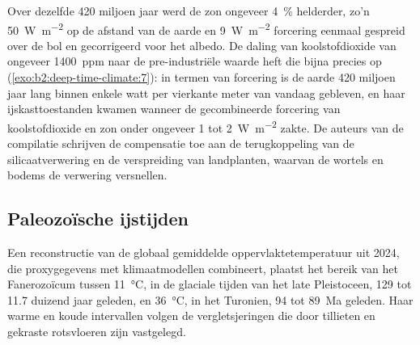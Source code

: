 \begin{omfigure}
\par{}
\end{omfigure}

Over dezelfde 420 miljoen jaar werd de zon ongeveer \qty{4}{\percent} helderder, zo'n
\qty{50}{W.m^{-2}} op de afstand van de aarde en \qty{9}{W.m^{-2}} forcering eenmaal gespreid over de
bol en gecorrigeerd voor het albedo. De daling van koolstofdioxide van ongeveer \qty{1400}{ppm} naar de
pre-industriële waarde heft die bijna precies op (\cref{exo:b2:deep-time-climate:7}): in termen van
forcering is de aarde 420 miljoen jaar lang binnen enkele watt per vierkante meter van vandaag gebleven,
en haar ijskasttoestanden kwamen wanneer de gecombineerde forcering van koolstofdioxide en zon onder ongeveer 1
tot \qty{2}{W.m^{-2}} zakte. De auteurs van de compilatie schrijven de compensatie toe aan de terugkoppeling van de
silicaatverwering en de verspreiding van landplanten, waarvan de wortels en bodems de verwering versnellen.

\subsection*{Paleozoïsche ijstijden}

Een reconstructie van de globaal gemiddelde oppervlaktetemperatuur uit 2024, die proxygegevens
met klimaatmodellen combineert, plaatst het bereik van het Fanerozoïcum tussen \qty{11}{\celsius}, in de glaciale tijden van
het late Pleistoceen, 129 tot 11.7 duizend jaar geleden, en \qty{36}{\celsius}, in het Turonien, 94 tot \qty{89}{Ma} geleden.
Haar warme en koude intervallen volgen de vergletsjeringen die door tillieten en gekraste rotsvloeren zijn vastgelegd.

